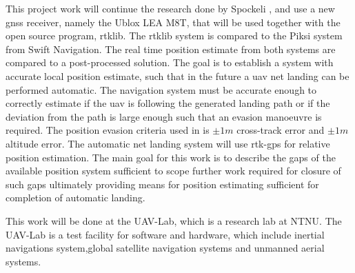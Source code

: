 This project work will continue the research done by Spockeli \citep{Spockeli}, and use a new \gls{gnss} receiver, namely the Ublox LEA M8T, that will be used together with the open source program, \gls{rtklib}. The \gls{rtklib} system is compared to the Piksi system from Swift Navigation. The real time position estimate from both systems are compared to a post-processed solution. The goal is to establish a system with accurate local position estimate, such that in the future a \gls{uav} net landing can be performed automatic. The navigation system must be accurate enough to correctly estimate if the \gls{uav} is following the generated landing path or if the deviation from the path is large enough such that an evasion manoeuvre is required. The position evasion criteria used in \citep{Froelich} is $\pm1m$ cross-track error and $\pm1m$ altitude error.
The automatic net landing system will use \gls{rtk-gps} for relative position estimation. The main goal for this work is to describe the gaps of the available position system sufficient to scope further work required for closure of such gaps ultimately providing means for position estimating sufficient for completion of automatic landing.

This work will be done at the UAV-Lab, which is a research lab at NTNU. The UAV-Lab is a test facility for software and hardware, which include inertial navigations system,global satellite navigation systems and unmanned aerial systems.


